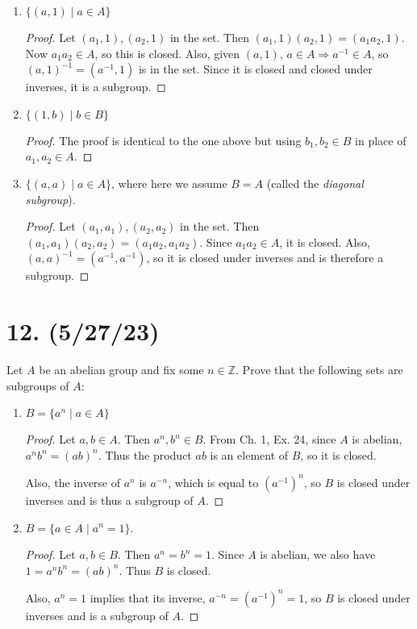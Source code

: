 \documentclass{article}
\begin{document}
\begin{enumerate}[label=(\alph*)]
    \item $\{ (a, 1) \mid a \in A \}$
          \begin{proof}
            Let $(a_1, 1), (a_2, 1)$ in the set. Then $(a_1, 1)(a_2, 1) = (a_1 a_2, 1)$. Now $a_1 a_2 \in A$, so this is closed. Also, given $(a, 1)$, $a \in A \Rightarrow a^{-1} \in A$, so $(a, 1)^{-1} = (a^{-1}, 1)$ is in the set. Since it is closed and closed under inverses, it is a subgroup.
          \end{proof}
    \item $\{ (1, b) \mid b \in B \}$
          \begin{proof}
            The proof is identical to the one above but using $b_1, b_2 \in B$ in place of $a_1, a_2 \in A$.
          \end{proof}
    \item $\{ (a, a) \mid a \in A \}$, where here we assume $B = A$ (called the \emph{diagonal subgroup}).
          \begin{proof}
            Let $(a_1, a_1), (a_2, a_2)$ in the set. Then $(a_1, a_1)(a_2, a_2) = (a_1 a_2, a_1 a_2)$. Since $a_1 a_2 \in A$, it is closed. Also, $(a, a)^{-1} = (a^{-1}, a^{-1})$, so it is closed under inverses and is therefore a subgroup.
          \end{proof}
\end{enumerate}

\section*{12. (5/27/23)}

Let $A$ be an abelian group and fix some $n \in \mathbb{Z}$. Prove that the following sets are subgroups of $A$:
\begin{enumerate}[label=(\alph*)]
    \item $B = \{ a^n \mid a \in A \}$
          \begin{proof}
            Let $a, b \in A$. Then $a^n, b^n \in B$. From Ch. 1, Ex. 24, since $A$ is abelian, $a^n b^n = (ab)^n$. Thus the product $ab$ is an element of $B$, so it is closed.

            Also, the inverse of $a^n$ is $a^{-n}$, which is equal to $(a^{-1})^n$, so $B$ is closed under inverses and is thus a subgroup of $A$.
          \end{proof}
    \item $B = \{ a \in A \mid a^n = 1 \}$.
          \begin{proof}
            Let $a, b \in B$. Then $a^n = b^n = 1$. Since $A$ is abelian, we also have $1 = a^n b^n = (ab)^n$. Thus $B$ is closed.

            Also, $a^n = 1$ implies that its inverse, $a^{-n} = (a^{-1})^n = 1$, so $B$ is closed under inverses and is a subgroup of $A$.
          \end{proof}
\end{enumerate}
\end{document}
